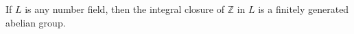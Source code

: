 If $L$ is any number field, then the integral closure of $\mathbb{Z}$ in $L$ is
a finitely generated abelian group.
